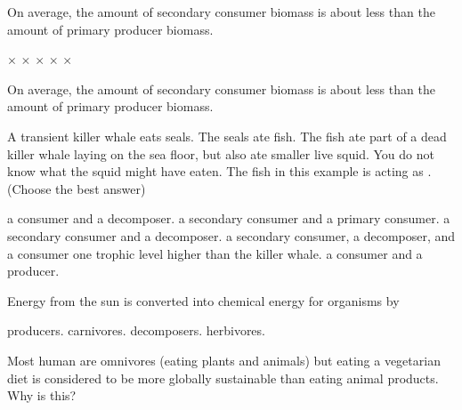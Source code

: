 \question
On average, the amount of secondary consumer biomass is about \underline{\hspace{2cm}} less than the amount of primary producer biomass. 
\begin{choices}
$\times$ %
$\times$ %
$\times$ %
$\times$ %
$\times$ %
\end{choices}

\question
On average, the amount of secondary consumer biomass is about \underline{\hspace{2cm}} less than the amount of primary producer biomass. 
\begin{choices}
\times %
\times %
\times %
\times %
\times %
\end{choices}


\question
A transient killer whale eats seals. The seals ate fish. The fish ate part of a dead killer whale laying on the sea floor, but also ate smaller live squid. You do not know what the squid might have eaten. The fish in this example is acting as \underline{\hspace{2cm}}. (Choose the best answer)

\begin{choices}
\correctchoice a consumer and a decomposer.%
\choice a secondary consumer and a primary consumer.%
\choice a secondary consumer and a decomposer.%
\choice a secondary consumer, a decomposer, and a consumer one trophic level higher than the killer whale.%
\choice a consumer and a producer.%
\end{choices}

\question
Energy from the sun is converted into chemical energy for organisms by

\begin{choices}
\correctchoice producers.%
\choice carnivores.%
\choice decomposers.%
\choice herbivores.%
\end{choices}


\question
Most human are omnivores (eating plants and animals) but eating a vegetarian diet is considered to be more globally sustainable than eating animal products. Why is this?
 
